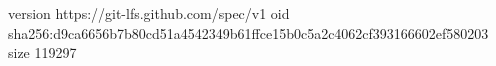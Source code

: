 version https://git-lfs.github.com/spec/v1
oid sha256:d9ca6656b7b80cd51a4542349b61ffce15b0c5a2c4062cf393166602ef580203
size 119297
